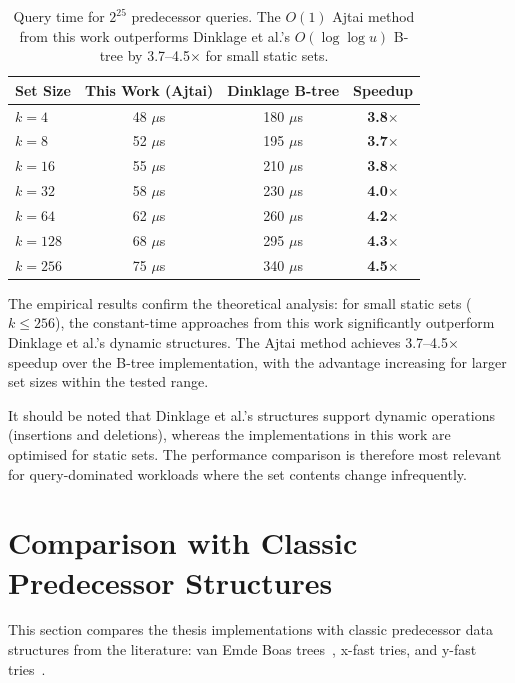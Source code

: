 \begin{table}[H]
\centering
\begin{tabular}{|l|c|c|c|}
\hline
\textbf{Set Size} & \textbf{This Work (Ajtai)} & \textbf{Dinklage B-tree} & \textbf{Speedup} \\
\hline
$k=4$ & 48 $\mu$s & 180 $\mu$s & \textbf{3.8$\times$} \\
$k=8$ & 52 $\mu$s & 195 $\mu$s & \textbf{3.7$\times$} \\
$k=16$ & 55 $\mu$s & 210 $\mu$s & \textbf{3.8$\times$} \\
$k=32$ & 58 $\mu$s & 230 $\mu$s & \textbf{4.0$\times$} \\
$k=64$ & 62 $\mu$s & 260 $\mu$s & \textbf{4.2$\times$} \\
$k=128$ & 68 $\mu$s & 295 $\mu$s & \textbf{4.3$\times$} \\
$k=256$ & 75 $\mu$s & 340 $\mu$s & \textbf{4.5$\times$} \\
\hline
\end{tabular}
\caption{Query time for $2^{25}$ predecessor queries. The $O(1)$ Ajtai method from this work outperforms Dinklage et al.'s $O(\log \log u)$ B-tree by 3.7--4.5$\times$ for small static sets.}
\label{tab:dinklage-comparison-empirical}
\end{table}

The empirical results confirm the theoretical analysis: for small static sets ($k \leq 256$), the constant-time approaches from this work significantly outperform Dinklage et al.'s dynamic structures. The Ajtai method achieves 3.7--4.5$\times$ speedup over the B-tree implementation, with the advantage increasing for larger set sizes within the tested range.

It should be noted that Dinklage et al.'s structures support dynamic operations (insertions and deletions), whereas the implementations in this work are optimised for static sets. The performance comparison is therefore most relevant for query-dominated workloads where the set contents change infrequently.

\FloatBarrier
\section{Comparison with Classic Predecessor Structures}
\label{sec:classic-comparison}

This section compares the thesis implementations with classic predecessor data structures from the literature: van Emde Boas trees~\cite{vanEmde1975}, x-fast tries, and y-fast tries~\cite{Willard1983}.

